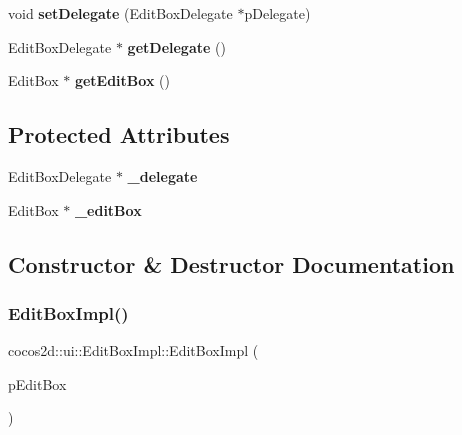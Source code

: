 \begin{DoxyCompactItemize}
\item 
\mbox{\label{classcocos2d_1_1ui_1_1EditBoxImpl_acfc392328fdff25f7dff85034af123a3}} 
void {\bfseries set\+Delegate} (Edit\+Box\+Delegate $\ast$p\+Delegate)
\item 
\mbox{\label{classcocos2d_1_1ui_1_1EditBoxImpl_a59a35c4754b30c308a3433797e0b10b9}} 
Edit\+Box\+Delegate $\ast$ {\bfseries get\+Delegate} ()
\item 
\mbox{\label{classcocos2d_1_1ui_1_1EditBoxImpl_ab22123f065dfe3ad6b022414a4753a1a}} 
Edit\+Box $\ast$ {\bfseries get\+Edit\+Box} ()
\end{DoxyCompactItemize}
\subsection*{Protected Attributes}
\begin{DoxyCompactItemize}
\item 
\mbox{\label{classcocos2d_1_1ui_1_1EditBoxImpl_a687e64450e305b5e6e9b65e2c0d55153}} 
Edit\+Box\+Delegate $\ast$ {\bfseries \+\_\+delegate}
\item 
\mbox{\label{classcocos2d_1_1ui_1_1EditBoxImpl_aa17d7e83819b271b33eff8e1e5b2dd63}} 
Edit\+Box $\ast$ {\bfseries \+\_\+edit\+Box}
\end{DoxyCompactItemize}


\subsection{Constructor \& Destructor Documentation}
\mbox{\label{classcocos2d_1_1ui_1_1EditBoxImpl_a17428b425795ede3896056fd521c5cd4}} 
\subsubsection{\texorpdfstring{Edit\+Box\+Impl()}{EditBoxImpl()}\hspace{0.1cm}{\footnotesize\ttfamily [1/2]}}
{\footnotesize\ttfamily cocos2d\+::ui\+::\+Edit\+Box\+Impl\+::\+Edit\+Box\+Impl (\begin{DoxyParamCaption}\item[{Edit\+Box $\ast$}]{p\+Edit\+Box }\end{DoxyParamCaption})\hspace{0.3cm}{\ttfamily [inline]}}

